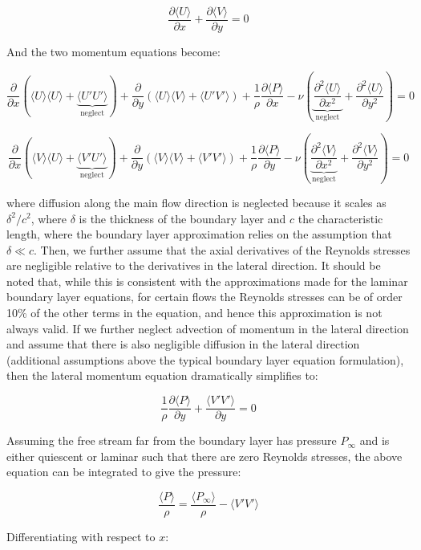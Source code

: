 \documentclass[10pt]{article}
\newcommand{\beq}{\begin{equation}}
\newcommand{\eeq}{\end{equation}}
\newcommand{\la}{\langle}
\newcommand{\ra}{\rangle}
\begin{document}
\begin{flushleft}
\beq
\frac{\partial\la U\ra}{\partial x}+\frac{\partial\la V\ra}{\partial y}=0
\eeq

And the two momentum equations become:

\beq
\frac{\partial}{\partial x}\left(\la U\ra\la U\ra+\underbrace{\la U'U'\ra}_{\textrm{neglect}}\right)+\frac{\partial}{\partial y}\left(\la U\ra\la V\ra+\la U'V'\ra\right)+\frac{1}{\rho}\frac{\partial \la P\ra}{\partial x}-\nu\left(\underbrace{\frac{\partial^2 \la U\ra}{\partial x^2}}_{\textrm{neglect}}+\frac{\partial^2 \la U\ra}{\partial y^2}\right)=0
\eeq

\beq
\frac{\partial}{\partial x}\left(\la V\ra\la U\ra+\underbrace{\la V'U'\ra}_{\textrm{neglect}}\right)+\frac{\partial}{\partial y}\left(\la V\ra\la V\ra+\la V'V'\ra\right)+\frac{1}{\rho}\frac{\partial \la P\ra}{\partial y}-\nu\left(\underbrace{\frac{\partial^2 \la V\ra}{\partial x^2}}_{\textrm{neglect}}+\frac{\partial^2 \la V\ra}{\partial y^2}\right)=0
\eeq

where diffusion along the main flow direction is neglected because it scales as \(\delta^2/c^2\), where \(\delta\) is the thickness of the boundary layer and \(c\) the characteristic length, where the boundary layer approximation relies on the assumption that \(\delta\ll c\). Then, we further assume that the axial derivatives of the Reynolds stresses are negligible relative to the derivatives in the lateral direction. It should be noted that, while this is consistent with the approximations made for the laminar boundary layer equations, for certain flows the Reynolds stresses can be of order 10\% of the other terms in the equation, and hence this approximation is not always valid. If we further neglect advection of momentum in the lateral direction and assume that there is also negligible diffusion in the lateral direction (additional assumptions above the typical boundary layer equation formulation), then the lateral momentum equation dramatically simplifies to:

\beq
\frac{1}{\rho}\frac{\partial\la P\ra}{\partial y}+\frac{\la V'V'\ra}{\partial y}=0
\eeq

Assuming the free stream far from the boundary layer has pressure \(P_{\infty}\) and is either quiescent or laminar such that there are zero Reynolds stresses, the above equation can be integrated to give the pressure:

\beq
\frac{\la P\ra}{\rho}=\frac{\la P_{\infty}\ra}{\rho}-\la V'V'\ra
\eeq

Differentiating with respect to \(x\):


\end{flushleft}
\end{document}
